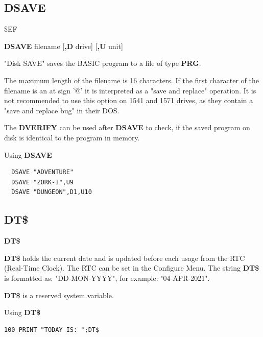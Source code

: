 \subsection{DSAVE}
\begin{description}[leftmargin=2cm,style=nextline]
\item [Token:] \$EF
\item [Format:] {\bf DSAVE} filename [{\bf,D} drive] [{\bf,U} unit]
\item [Usage:]
   "Disk SAVE" saves the BASIC program to
   a file of type {\bf PRG}.

   \filenamedefinition
   The maximum length of the filename is 16 characters.
   If the first character of the filename is an at sign '@' it
   is interpreted as a "save and replace" operation. It is not recommended
   to use this option on 1541 and 1571 drives, as they
   contain a "save and replace bug" in their DOS.

   \drivedefinition

   \unitdefinition

\item [Remarks:]
   The {\bf DVERIFY} can be used after {\bf DSAVE} to check,
   if the saved program on disk is identical to the program
   in memory.

\item [Example:] Using {\bf DSAVE}
\begin{tcolorbox}[colback=black,coltext=white]
\verbatimfont{\codefont}
\begin{verbatim}
  DSAVE "ADVENTURE"
  DSAVE "ZORK-I",U9
  DSAVE "DUNGEON",D1,U10
\end{verbatim}
\end{tcolorbox}
\end{description}


\newpage
\subsection{DT\$}
\begin{description}[leftmargin=2cm,style=nextline]
\item [Format:] {\bf DT\$}
\item [Usage:]  {\bf DT\$} holds the current date and is updated before
                each usage from the RTC (Real-Time Clock).
                The RTC can be set in the Configure Menu.
                The string {\bf DT\$} is formatted as:
                "DD-MON-YYYY", for example: "04-APR-2021".
\item[Remarks:] {\bf DT\$} is a reserved system variable.

\item [Example:] Using {\bf DT\$}
\begin{tcolorbox}[colback=black,coltext=white]
\verbatimfont{\codefont}
\begin{verbatim}
100 PRINT "TODAY IS: ";DT$
\end{verbatim}
\end{tcolorbox}
\end{description}

